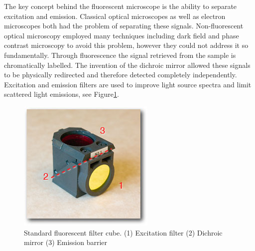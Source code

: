 The key concept behind the fluorescent microscope is the ability to separate excitation and emission.
Classical optical microscopes as well as electron microscopes both had the %
problem of separating these signals.
Non-fluorescent optical microscopy employed many techniques including dark field and phase contrast microscopy to avoid this problem, however they could not address it so fundamentally\cite{Murphy2012e}.
Through fluorescence the signal retrieved from the sample is chromatically labelled. %
The invention of the dichroic mirror allowed these signals to be physically redirected and therefore detected completely independently.
Excitation and emission filters are used to improve light source spectra and limit scattered light emissions, see Figure\ref{fig:filtercube}.




\begin{figure}
	\centering
	\includegraphics[width=0.3\linewidth]{filtercube}
	\caption[Fluorescent filter cube]{Standard fluorescent filter cube.
	(1) Excitation filter (2) Dichroic mirror (3) Emission barrier}
	\label{fig:filtercube}
\end{figure}
